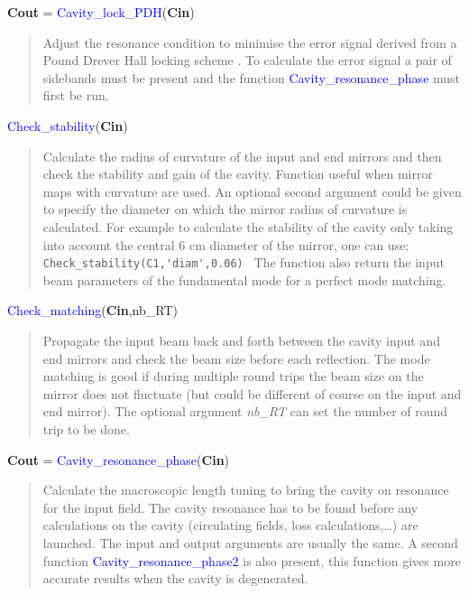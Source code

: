 \noindent \textbf{Cout} = \textcolor{blue}{Cavity\_lock\_PDH}(\textbf{Cin})
\vspace*{-0.2cm}
\begin{quote}
Adjust the resonance condition to minimise the error signal derived from a Pound Drever Hall locking scheme \cite{black:79}. To calculate the error signal a pair of sidebands must be present and the function \textcolor{blue}{Cavity\_resonance\_phase} must first be run.
\end{quote}

\noindent \textcolor{blue}{Check\_stability}(\textbf{Cin})
\vspace*{-0.2cm}
\begin{quote}
Calculate the radius of curvature of the input and end mirrors and then check the stability and gain of the cavity. Function useful when mirror maps with curvature are used. An optional second argument could be given to specify the diameter on which the mirror radius of curvature is calculated. For example to calculate the stability of the cavity only taking into account the central 6 cm diameter of the mirror, one can use:
\verb? Check_stability(C1,'diam',0.06) ?
The function also return the input beam parameters of the fundamental mode for a perfect mode matching.

\end{quote}

\noindent \textcolor{blue}{Check\_matching}(\textbf{Cin},nb\_RT)
\vspace*{-0.2cm}
\begin{quote}
Propagate the input beam back and forth between the cavity input and end mirrors and check the beam size before each reflection. The mode matching is good if during multiple round trips the beam size on the mirror does not fluctuate (but could be different of course on the input and end mirror). The optional argument \textsl{nb\_RT} can set the number of round trip to be done.
\end{quote}

\noindent \textbf{Cout} = \textcolor{blue}{Cavity\_resonance\_phase}(\textbf{Cin})
\vspace*{-0.2cm}
\begin{quote}
Calculate the macroscopic length tuning to bring the cavity on resonance for the input field. The cavity resonance has to be found before any calculations on the cavity (circulating fields, loss calculations,\dots) are launched. The input and output arguments are usually the same.
A second function \textcolor{blue}{Cavity\_resonance\_phase2} is also present, this function gives more accurate results when the cavity is degenerated.
\end{quote}

